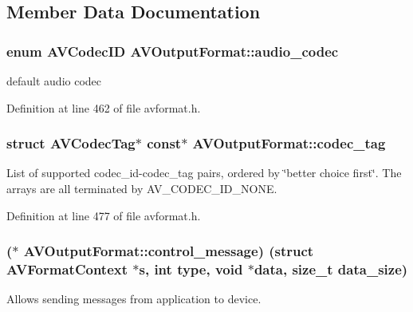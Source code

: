 \subsection{Member Data Documentation}
\subsubsection[{\texorpdfstring{audio\+\_\+codec}{audio_codec}}]{\setlength{\rightskip}{0pt plus 5cm}enum {\bf A\+V\+Codec\+ID} A\+V\+Output\+Format\+::audio\+\_\+codec}\hypertarget{struct_a_v_output_format_a2e4fff0aa061984d586ea08ecad96141}{}\label{struct_a_v_output_format_a2e4fff0aa061984d586ea08ecad96141}
default audio codec 

Definition at line 462 of file avformat.\+h.

\subsubsection[{\texorpdfstring{codec\+\_\+tag}{codec_tag}}]{ struct A\+V\+Codec\+Tag$\ast$ {\bf const}$\ast$ A\+V\+Output\+Format\+::codec\+\_\+tag}\hypertarget{struct_a_v_output_format_ac55f4c21dd75c8c48b9de5080681eed4}{}\label{struct_a_v_output_format_ac55f4c21dd75c8c48b9de5080681eed4}
List of supported codec\+\_\+id-\/codec\+\_\+tag pairs, ordered by \char`\"{}better
choice first\char`\"{}. The arrays are all terminated by A\+V\+\_\+\+C\+O\+D\+E\+C\+\_\+\+I\+D\+\_\+\+N\+O\+NE. 

Definition at line 477 of file avformat.\+h.

\subsubsection[{\texorpdfstring{control\+\_\+message}{control_message}}]{($\ast$ A\+V\+Output\+Format\+::control\+\_\+message) (struct {\bf A\+V\+Format\+Context} $\ast${\bf s}, {\bf int} type, {\bf void} $\ast${\bf data}, size\+\_\+t data\+\_\+size)}\hypertarget{struct_a_v_output_format_aaf8c014593bd71d0bb5f542267a02a90}{}\label{struct_a_v_output_format_aaf8c014593bd71d0bb5f542267a02a90}
Allows sending messages from application to device. 

